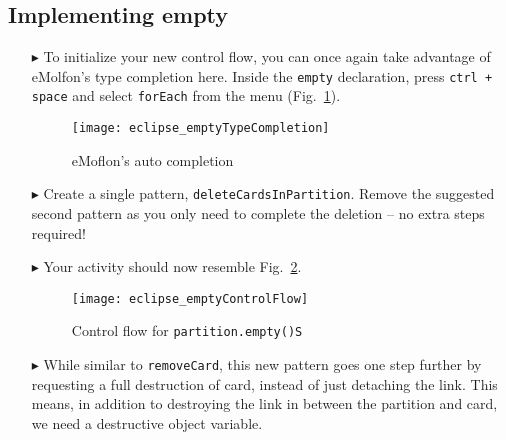 \newpage
\hypertarget{emptyPartition tex}{}
\subsection{Implementing empty}
\texHeader

\begin{itemize}
 
\item[$\blacktriangleright$] To initialize your new control flow, you can once again take advantage of eMolfon's type completion here. Inside the
\texttt{empty} declaration, press  \texttt{ctrl + space} and select \texttt{forEach} from the menu (Fig.~\ref{fig:typeCompletion}).

\vspace{1cm}

\begin{figure}[htpb]
\begin{center}
  \texttt{[image: eclipse\_emptyTypeCompletion]}
  \caption{eMoflon's auto completion}
  \label{fig:typeCompletion}
\end{center}
\end{figure}

\vspace{1cm}

\item[$\blacktriangleright$] Create a single pattern, \texttt{deleteCardsInPartition}. Remove the suggested second pattern as you only need to complete the
deletion -- no extra steps required!

\item[$\blacktriangleright$] Your activity should now resemble Fig.~\ref{fig:emptyControlFlow}.

\clearpage

\begin{figure}[htpb]
\begin{center}
  \texttt{[image: eclipse\_emptyControlFlow]}
  \caption{Control flow for \texttt{partition.empty()S}}
  \label{fig:emptyControlFlow}
\end{center}
\end{figure}

\item[$\blacktriangleright$] While similar to \texttt{removeCard}, this new pattern goes one step further by requesting a full destruction of card, instead of
just detaching the link. This means, in addition to destroying the link in between the partition and card, we need a destructive object variable.


\end{itemize}
